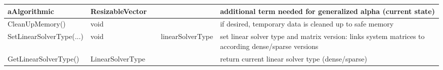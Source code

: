 \begin{center}
\begin{longtable}{| p{4.2cm} | p{2.5cm} | p{0.3cm} | p{3.0cm} | p{6cm} |}
    aAlgorithmic &     ResizableVector &      &      &     additional term needed for generalized alpha (current state)\\ \hline
    CleanUpMemory() &     void &      &      &     if desired, temporary data is cleaned up to safe memory\\ \hline
    SetLinearSolverType(...) &     void &      &     linearSolverType &     set linear solver type and matrix version: links system matrices to according dense/sparse versions\\ \hline
    GetLinearSolverType() &     LinearSolverType &      &      &     return current linear solver type (dense/sparse)\\ \hline
	  \end{longtable}
	\end{center}

